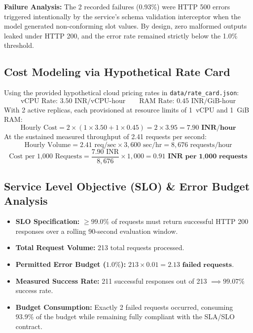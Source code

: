 \documentclass[10pt,a4paper]{article}
\begin{document}
\textbf{Failure Analysis:} The 2 recorded failures (0.93\%) were HTTP 500 errors triggered intentionally by the service's schema validation interceptor when the model generated non-conforming slot values. By design, zero malformed outputs leaked under HTTP 200, and the error rate remained strictly below the 1.0\% threshold.

\subsection{Cost Modeling via Hypothetical Rate Card}
Using the provided hypothetical cloud pricing rates in \texttt{data/rate\_card.json}:
$$\text{vCPU Rate: } 3.50\text{ INR/vCPU-hour} \qquad \text{RAM Rate: } 0.45\text{ INR/GiB-hour}$$
With 2 active replicas, each provisioned at resource limits of 1~vCPU and 1~GiB RAM:
$$\text{Hourly Cost} = 2 \times (1 \times 3.50 + 1 \times 0.45) = 2 \times 3.95 = \mathbf{7.90\text{ INR/hour}}$$
At the sustained measured throughput of 2.41 requests per second:
$$\text{Hourly Volume} = 2.41\text{ req/sec} \times 3,600\text{ sec/hr} = 8,676\text{ requests/hour}$$
$$\text{Cost per 1,000 Requests} = \frac{7.90\text{ INR}}{8,676} \times 1,000 = \mathbf{0.91\text{ INR per 1,000 requests}}$$

\subsection{Service Level Objective (SLO) \& Error Budget Analysis}
\begin{itemize}[noitemsep,topsep=2pt,leftmargin=*]
    \item \textbf{SLO Specification:} $\ge 99.0\%$ of requests must return successful HTTP 200 responses over a rolling 90-second evaluation window.
    \item \textbf{Total Request Volume:} 213 total requests processed.
    \item \textbf{Permitted Error Budget ($1.0\%$):} $213 \times 0.01 = \mathbf{2.13\text{ failed requests}}$.
    \item \textbf{Measured Success Rate:} 211 successful responses out of 213 $\implies \mathbf{99.07\%}$ success rate.
    \item \textbf{Budget Consumption:} Exactly 2 failed requests occurred, consuming 93.9\% of the budget while remaining fully compliant with the SLA/SLO contract.
\end{itemize}
\end{document}
